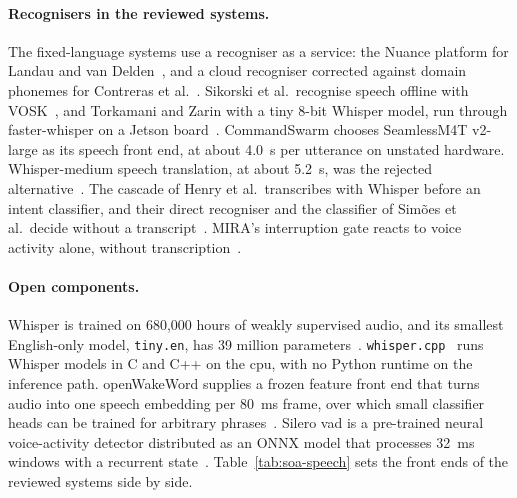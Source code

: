 \paragraph{Recognisers in the reviewed systems.} The fixed-language systems use a recogniser as a
service: the Nuance platform for Landau and van Delden~\cite{landau2017}, and a cloud recogniser
corrected against domain phonemes for Contreras et al.~\cite{contreras2020}. Sikorski et al.\
recognise speech offline with VOSK~\cite{sikorski2025}, and Torkamani and Zarin with a tiny 8-bit
Whisper model, run through faster-whisper on a Jetson board~\cite{torkamani2025}. CommandSwarm
chooses SeamlessM4T v2-large as its speech front end, at about 4.0~s per utterance on unstated
hardware. Whisper-medium speech translation, at about 5.2~s, was the rejected
alternative~\cite{commandswarm2026}. The cascade of Henry et al.\ transcribes with Whisper before an
intent classifier, and their direct recogniser and the classifier of Sim\~oes et al.\ decide without
a transcript~\cite{henry2026,simoes2024}. MIRA's interruption gate reacts to voice activity alone,
without transcription~\cite{mira}.

\paragraph{Open components.} Whisper is trained on 680{,}000 hours of weakly supervised audio, and
its smallest English-only model, \texttt{tiny.en}, has 39 million parameters~\cite{whisper}.
\texttt{whisper.cpp}~\cite{whispercpp} runs Whisper models in C and C++ on the \gls{cpu}, with no
Python runtime on the inference path. openWakeWord supplies a frozen feature front end that turns
audio into one speech embedding per 80~ms frame, over which small classifier heads can be trained
for arbitrary phrases~\cite{oww}. Silero \gls{vad} is a pre-trained neural voice-activity detector
distributed as an ONNX model that processes 32~ms windows with a recurrent state~\cite{silero}.
Table~\ref{tab:soa-speech} sets the front ends of the reviewed systems side by side.

